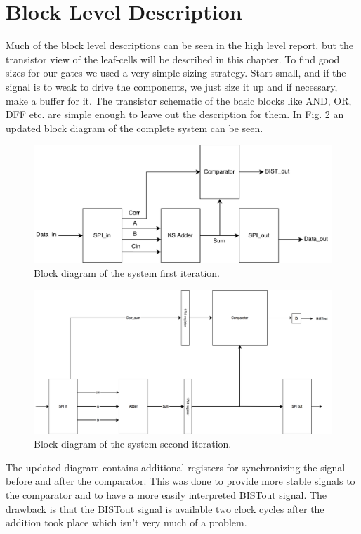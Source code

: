 \section{Block Level Description} \label{sec:block_level}
Much of the block level descriptions can be seen in the high level report, but the transistor view of the leaf-cells will be described in this chapter. To find good sizes for our gates we used a very simple sizing strategy. Start small, and if the signal is to weak to drive the components, we just size it up and if necessary, make a buffer for it. The transistor schematic of the basic blocks like AND, OR, DFF etc. are simple enough to leave out the description for them. In Fig. \ref{block_second} an updated block diagram of the complete system can be seen.

\begin{figure}[H]
  \centering
  \captionsetup{justification=centering}
  \includegraphics[scale=0.5]{../figures/TOP.pdf}
  \caption{Block diagram of the system first iteration.} \label{fig:block_first}
\end{figure}

\begin{figure}[H]
\centering
\captionsetup{justification=centering}
\includegraphics[scale=0.175]{../figures/top_level.png}
\caption{Block diagram of the system second iteration.}
\label{block_second}
\end{figure}


\noindent The updated diagram contains additional registers for synchronizing the signal before and after the comparator. This was done to provide more stable signals to the comparator and to have a more easily interpreted BISTout signal. The drawback is that the BISTout signal is available two clock cycles after the addition took place which isn't very much of a problem.
